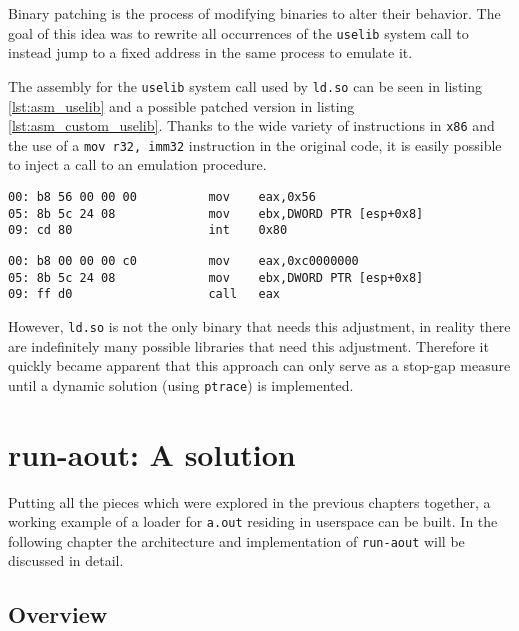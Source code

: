 \documentclass{article}
\begin{document}
Binary patching is the process of modifying binaries to alter their behavior\cite{citation needed}. The goal of this idea was to rewrite all occurrences of the \texttt{uselib} system call to instead jump to a fixed address in the same process to emulate it.

The assembly for the \texttt{uselib} system call used by \texttt{ld.so} can be seen in listing \ref{lst:asm_uselib} and a possible patched version in listing \ref{lst:asm_custom_uselib}. Thanks to the wide variety of instructions in \texttt{x86} and the use of a \texttt{mov r32, imm32} instruction in the original code, it is easily possible to inject a call to an emulation procedure.

\begin{lstlisting}[caption={Assembly for the invocation of the \texttt{uselib} system call as used by \texttt{ld.so}}, label={lst:asm_uselib}]
00:	b8 56 00 00 00       	mov    eax,0x56
05:	8b 5c 24 08          	mov    ebx,DWORD PTR [esp+0x8]
09:	cd 80                	int    0x80
\end{lstlisting}

\begin{lstlisting}[caption={A possible patch replacing the system call with a call to our custom handler located at (for example) \texttt{0xc000\_0000}}, label={lst:asm_custom_uselib}]
00:	b8 00 00 00 c0       	mov    eax,0xc0000000
05:	8b 5c 24 08          	mov    ebx,DWORD PTR [esp+0x8]
09:	ff d0                	call   eax
\end{lstlisting}

However, \texttt{ld.so} is not the only binary that needs this adjustment, in reality there are indefinitely many possible libraries that need this adjustment. Therefore it quickly became apparent that this approach can only serve as a stop-gap measure until a dynamic solution (using \texttt{ptrace}) is implemented.

\section{run-aout: A solution}
\label{solution}

Putting all the pieces which were explored in the previous chapters together, a working example of a loader for \texttt{a.out} residing in userspace can be built. In the following chapter the architecture and implementation of \texttt{run-aout} will be discussed in detail.

\subsection{Overview}
\label{solution_overview}
\end{document}
